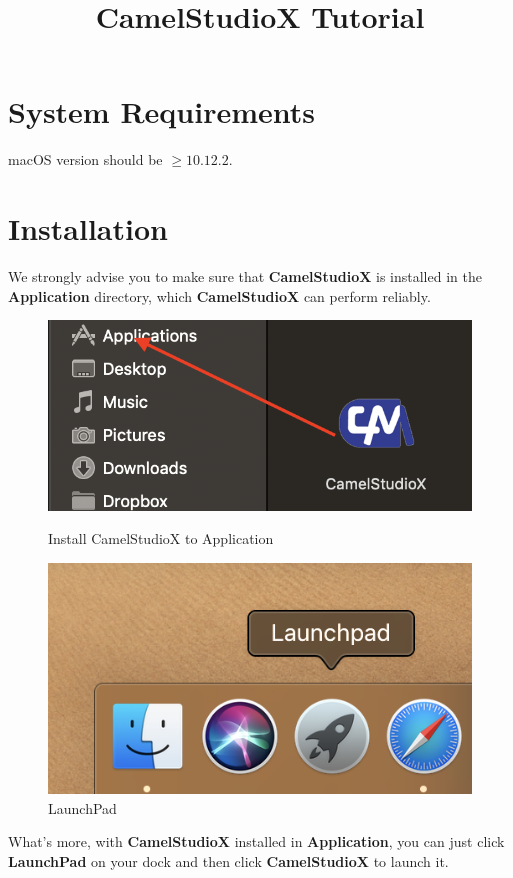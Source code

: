 \documentclass{article}
\title{CamelStudioX Tutorial}
\begin{document}
	
	\maketitle
	\section{System Requirements}
		macOS version should be $\geq10.12.2$.
	\section{Installation}
		We strongly advise you to make sure that \textbf{CamelStudioX} is installed in the \textbf{Application} directory, which \textbf{CamelStudioX} can perform reliably.

		\begin{figure}[h]
			
			\begin{minipage}[h]{0.5\linewidth}
				\centering
				\includegraphics[width=.75\textwidth]{Installation.png}
				\caption{Install CamelStudioX to Application}
			\end{minipage} 
			\begin{minipage}[h]{0.5\linewidth}
				\centering
				\includegraphics[width=.62\textwidth]{LaunchPad}
				\caption{LaunchPad}
			\end{minipage}
		\end{figure}
			
		What's more, with \textbf{CamelStudioX} installed in \textbf{Application}, you can just click \textbf{LaunchPad} on your dock and then click \textbf{CamelStudioX} to launch it.
		
\end{document}
